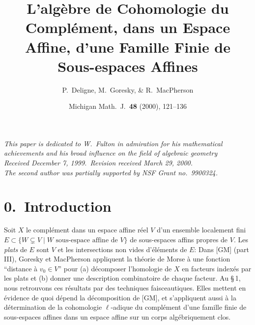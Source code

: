 \documentclass[11pt,a4paper]{article}
\theoremstyle{plain}
\theoremstyle{definition}
\begin{document}
\title{L'alg\`ebre de Cohomologie du Compl\'ement, dans un Espace Affine, d'une Famille Finie de Sous-espaces Affines}
\author{P.~Deligne, M.~Goresky, \& R.~MacPherson}
\date{\small Michigan Math.~J.\ \textbf{48} (2000), 121--136}
\maketitle

\begin{center}
\textit{This paper is dedicated to W.~Fulton in admiration for his mathematical}\\
\textit{achievements and his broad influence on the field of algebraic geometry}\\
\textit{Received December 7, 1999.\ Revision received March 29, 2000.}\\
\textit{The second author was partially supported by NSF Grant no.\ 9900324.}
\end{center}

\section*{0.\ Introduction}

Soit $X$ le compl\'ement dans un espace affine r\'eel $V$ d'un ensemble localement fini $E \subset \{W \subsetneq V \mid W \text{ sous-espace affine de } V\}$ de sous-espaces affins propres de $V$. Les \emph{plats} de $E$ sont $V$ et les intersections non vides d'\'el\'ements de $E$:
Dans [GM] (part III), Goresky et MacPherson appliquent la th\'eorie de Morse \`a une fonction ``distance \`a $v_0 \in V$'' pour (a) d\'ecomposer l'homologie de $X$ en facteurs index\'es par les plats et (b) donner une description combinatoire de chaque facteur. Au \S\,1, nous retrouvons ces r\'esultats par des techniques faisceautiques. Elles mettent en \'evidence de quoi d\'epend la d\'ecomposition de [GM], et s'appliquent aussi \`a la d\'etermination de la cohomologie $\ell$-adique du compl\'ement d'une famille finie de sous-espaces affines dans un espace affine sur un corps alg\'ebriquement clos.
\end{document}
